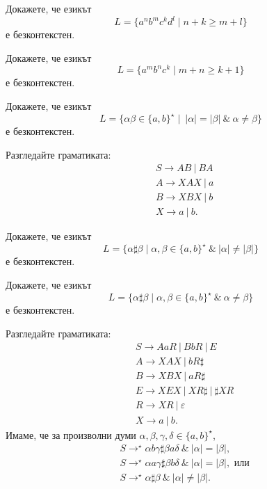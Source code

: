 \begin{problem}
  Докажете, че езикът 
  \[L = \{a^nb^mc^kd^l \mid n+k \geq m + l\}\]
  е безконтекстен.
\end{problem}

\begin{problem}
  Докажете, че езикът 
  \[L = \{a^mb^nc^k\mid m+n \geq k + 1\}\]
  е безконтекстен.  
\end{problem}

\begin{problem}
  \label{prob:equal-but-different}
  Докажете, че езикът
  \[L = \{\alpha\beta \in \{a,b\}^\star \mid\ |\alpha| = |\beta|\ \&\ \alpha \neq \beta\}\]
  е безконтекстен.
\end{problem}
\begin{hint}
  Разгледайте граматиката:
  \begin{align*}
    & S \to AB\ |\ BA\\
    & A \to XAX\ |\ a\\
    & B \to XBX\ |\ b\\
    & X \to a\ |\ b.
  \end{align*}
\end{hint}

\begin{problem}
  Докажете, че езикът
  \[L = \{\alpha \sharp \beta \mid \alpha,\beta \in \{a,b\}^\star\ \&\ |\alpha| \neq |\beta| \}\]
  е безконтекстен.
\end{problem}

\begin{problem}
 Докажете, че езикът
 \[L = \{\alpha \sharp \beta \mid \alpha,\beta \in \{a,b\}^\star\ \&\ \alpha \neq \beta \}\]
 е безконтекстен.
\end{problem}
\begin{hint}
  Разгледайте граматиката:
  \begin{align*}
    & S \to AaR\ |\ BbR\ |\ E\\
    & A \to XAX\ |\ bR\sharp\\
    & B \to XBX\ |\ aR\sharp\\
    & E \to XEX\ |\ XR\sharp\ |\ \sharp XR\\
    & R \to XR\ |\ \varepsilon\\
    & X \to a\ |\ b.
  \end{align*}
  Имаме, че за произволни думи $\alpha,\beta,\gamma,\delta \in \{a,b\}^\star$,
  \begin{align*}
    & S \to^\star \alpha b \gamma \sharp \beta a \delta\ \&\ |\alpha| = |\beta|,\\
    & S \to^\star \alpha a \gamma \sharp \beta b \delta\ \&\ |\alpha| = |\beta|, \text{ или}\\
    & S \to^\star \alpha \sharp \beta\ \&\ |\alpha| \neq |\beta|.
  \end{align*}      
\end{hint}

